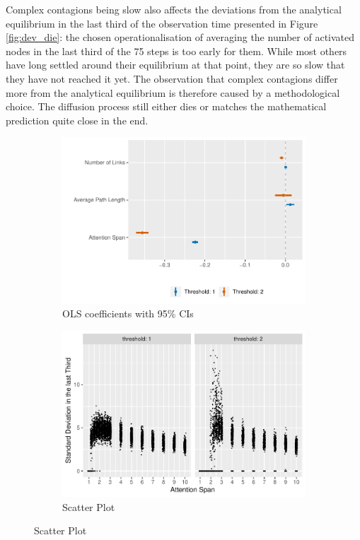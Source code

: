 \documentclass[a4paper,12pt]{article}
\begin{document}
Complex contagions being slow also affects the deviations from the analytical equilibrium in the last third of the observation time presented in Figure \ref{fig:dev_die}: the chosen operationalisation of averaging the number of activated nodes in the last third of the 75 steps is too early for them. While most others have long settled around their equilibrium at that point, they are so slow that they have not reached it yet. The observation that complex contagions differ more from the analytical equilibrium is therefore caused by a methodological choice. The diffusion process still either dies or matches the mathematical prediction quite close in the end.

\begin{figure}
\caption{Fluctuations around the Equilibrium}
\begin{subfigure}{.5\textwidth}
\centering
\includegraphics[width=\linewidth]{images/sd_coef.pdf}
\caption{OLS coefficients with 95\% CIs}
\end{subfigure}
\begin{subfigure}{.5\textwidth}
\centering
\includegraphics[width=\linewidth]{images/sd_scatter.pdf}
\caption{Scatter Plot}
\end{subfigure}
\label{fig:sd}
\end{figure}
\end{document}
